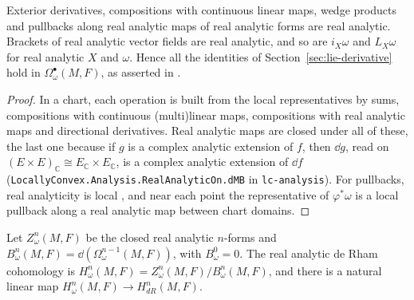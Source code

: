 \begin{theorem}
  \label{thm:analytic-forms}
  \leanok
  Exterior derivatives, compositions with continuous linear maps, wedge products and pullbacks
  along real analytic maps of real analytic forms are real analytic. Brackets of real analytic
  vector fields are real analytic, and so are $i_X\omega$ and $L_X\omega$ for real analytic $X$
  and $\omega$. Hence all the identities of Section~\ref{sec:lie-derivative} hold in
  $\Omega^\bullet_\omega(M, F)$, as asserted in \cite[Remark~3.6.18]{GN26}.
\end{theorem}

\begin{proof}
  \leanok
  In a chart, each operation is built from the local representatives by sums, compositions with
  continuous (multi)linear maps, compositions with real analytic maps and directional
  derivatives. Real analytic maps are closed under all of these, the last one because if $g$ is a
  complex analytic extension of $f$, then $\dd g$, read on $(E \times E)_{\mathbb{C}} \cong
  E_{\mathbb{C}} \times E_{\mathbb{C}}$, is a complex analytic extension of $\dd f$
  (\texttt{LocallyConvex.Analysis.RealAnalyticOn.dMB} in \texttt{lc-analysis}). For pullbacks,
  real analyticity is local \cite[Lemma~2.2.3]{GN26}, and near each point the representative of
  $\varphi^*\omega$ is a local pullback along a real analytic map between chart domains.
\end{proof}

\begin{definition}
  \label{def:analytic-de-rham}
  \leanok
  Let $Z^n_\omega(M, F)$ be the closed real analytic $n$-forms and $B^n_\omega(M, F) =
  \dd(\Omega^{n-1}_\omega(M, F))$, with $B^0_\omega = 0$. The real analytic de Rham cohomology is
  $H^n_\omega(M, F) = Z^n_\omega(M, F)/B^n_\omega(M, F)$, and there is a natural linear map
  $H^n_\omega(M, F) \to H^n_{dR}(M, F)$.
\end{definition}


